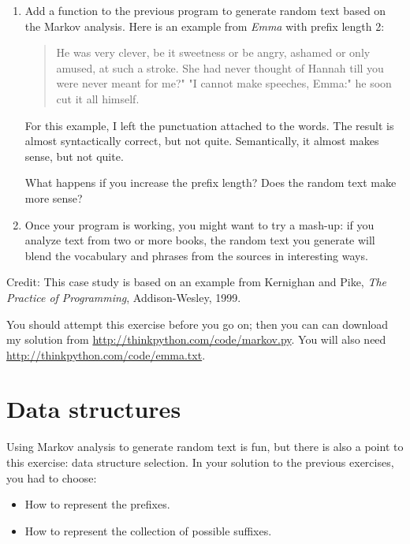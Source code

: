 \documentclass[10pt]{book}
\begin{document}
\begin{CJK}{UTF8}{gbsn}
\begin{exercise}
\begin{enumerate}
\item Add a function to the previous program to generate random text
based on the Markov analysis.  Here is an example from {\em Emma}
with prefix length 2:

\begin{quote}
He was very clever, be it sweetness or be angry, ashamed or only
amused, at such a stroke. She had never thought of Hannah till you
were never meant for me?" "I cannot make speeches, Emma:" he soon cut
it all himself.
\end{quote}

For this example, I left the punctuation attached to the words.
The result is almost syntactically correct, but not quite.
Semantically, it almost makes sense, but not quite.

What happens if you increase the prefix length?  Does the random
text make more sense?

\item Once your program is working, you might want to try a mash-up:
if you analyze text from two or more books, the random
text you generate will blend the vocabulary and phrases from
the sources in interesting ways.

\end{enumerate}

Credit: This case study is based on an example from Kernighan and
Pike, {\em The Practice of Programming}, Addison-Wesley, 1999.

\end{exercise}

You should attempt this exercise before you go on; then you can can
download my solution from \url{http://thinkpython.com/code/markov.py}.  You
will also need \url{http://thinkpython.com/code/emma.txt}.


\section{Data structures}

Using Markov analysis to generate random text is fun, but there is
also a point to this exercise: data structure selection.  In your
solution to the previous exercises, you had to choose:

\begin{itemize}

\item How to represent the prefixes.

\item How to represent the collection of possible suffixes.


\end{itemize}
\end{CJK}
\end{document}
